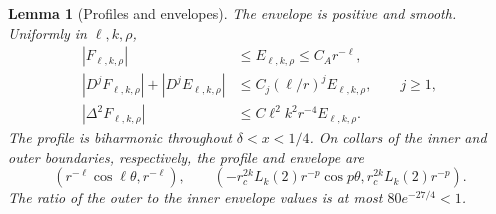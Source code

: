 \documentclass[11pt,twoside,leqno]{article}
\numberwithin{equation}{section}
\newtheorem{lemma}[theorem]{Lemma}
\theoremstyle{definition}
\theoremstyle{remark}
\begin{document}
\begin{lemma}[Profiles and envelopes]\label{lem:profile}
The envelope is positive and smooth. Uniformly in $\ell,k,\rho$,
\begin{align}
 |F_{\ell,k,\rho}|&\le E_{\ell,k,\rho}\le C_A r^{-\ell},
                                                     \label{eq:profile-size}\\
 |D^jF_{\ell,k,\rho}|+|D^jE_{\ell,k,\rho}|
 &\le C_j(\ell/r)^jE_{\ell,k,\rho},\qquad j\ge1,
                                                     \label{eq:profile-jets}\\
 |\Delta^2F_{\ell,k,\rho}|
 &\le C\ell^2k^2r^{-4}E_{\ell,k,\rho}.                \label{eq:profile-source}
\end{align}
The profile is biharmonic throughout $\delta<x<1/4$. On collars of
the inner and outer boundaries, respectively, the profile and envelope
are
\[
 (r^{-\ell}\cos\ell\theta,r^{-\ell}),\qquad
 (-r_c^{2k}L_k(2)r^{-p}\cos p\theta,r_c^{2k}L_k(2)r^{-p}).
\]
The ratio of the outer to the inner envelope values is at most
$80e^{-27/4}<1$.
\end{lemma}
\end{document}
